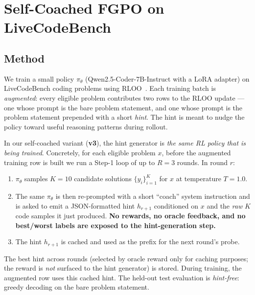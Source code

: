 %
%

\section{Self-Coached FGPO on LiveCodeBench}
\label{app:fgpo-v3}

\subsection{Method}

We train a small policy $\pi_\theta$ (Qwen2.5-Coder-7B-Instruct with a
LoRA adapter) on LiveCodeBench coding problems using
RLOO~\citep{ahmadian2024back}. Each training batch is \emph{augmented}:
every eligible problem contributes two rows to the RLOO update --- one
whose prompt is the bare problem statement, and one whose prompt is the
problem statement prepended with a short \emph{hint}. The hint is meant
to nudge the policy toward useful reasoning patterns during rollout.

In our self-coached variant (\textbf{v3}), the hint generator is
\emph{the same RL policy that is being trained}. Concretely, for each
eligible problem $x$, before the augmented training row is built we run
a Step-1 loop of up to $R=3$ rounds. In round $r$:
\begin{enumerate}
    \item $\pi_\theta$ samples $K=10$ candidate solutions
          $\{y_i\}_{i=1}^{K}$ for $x$ at temperature $T=1.0$.
    \item The same $\pi_\theta$ is then re-prompted with a short
          ``coach'' system instruction and is asked to emit a
          JSON-formatted hint $h_{r+1}$ conditioned on $x$ and the
          \emph{raw} $K$ code samples it just produced.
          \textbf{No rewards, no oracle feedback, and no best/worst
          labels are exposed to the hint-generation step.}
    \item The hint $h_{r+1}$ is cached and used as the prefix for the
          next round's probe.
\end{enumerate}
The best hint across rounds (selected by oracle reward only for caching
purposes; the reward is \emph{not} surfaced to the hint generator) is
stored. During training, the augmented row uses this cached hint. The
held-out test evaluation is \emph{hint-free}: greedy decoding on the
bare problem statement.

